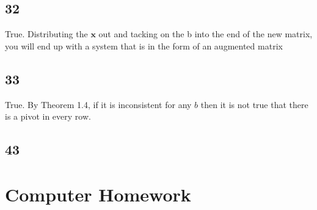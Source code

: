 \documentclass{article}
\begin{document}
\subsection*{32}
True. Distributing the $\mathbf{x}$ out and tacking on the b into the end of the new matrix, you will end up with a system that is in the form of an augmented matrix
\subsection*{33}
True. By Theorem 1.4, if it is inconsistent for any $b$ then it is not true that there is a pivot in every row.
\subsection*{43}
\section*{Computer Homework}
\end{document}
